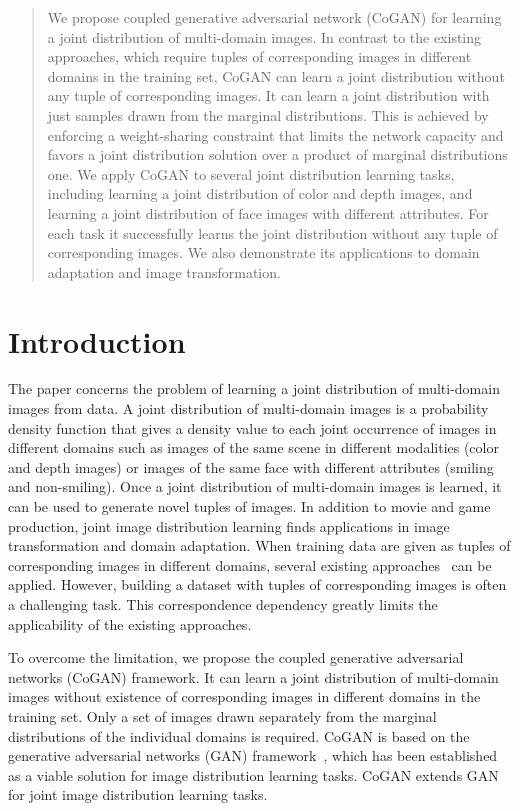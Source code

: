 \begin{abstract}
We propose coupled generative adversarial network (CoGAN) for learning a joint distribution of multi-domain images. In contrast to the existing approaches, which require tuples of corresponding images in different domains in the training set, CoGAN can learn a joint distribution without any tuple of corresponding images. It can learn a joint distribution with just samples drawn from the marginal distributions. This is achieved by enforcing a weight-sharing constraint that limits the network capacity and favors a joint distribution solution over a product of marginal distributions one. We apply CoGAN to several joint distribution learning tasks, including learning a joint distribution of color and depth images, and learning a joint distribution of face images with different attributes. For each task it successfully learns the joint distribution without any tuple of corresponding images. We also demonstrate its applications to domain adaptation and image transformation.
\end{abstract}

\section{Introduction}

The paper concerns the problem of learning a joint distribution of multi-domain images from data. A joint distribution of multi-domain images is a probability density function that gives a density value to each joint occurrence of images in different domains such as images of the same scene in different modalities (color and depth images) or images of the same face with different attributes (smiling and non-smiling). Once a joint distribution of multi-domain images is learned, it can be used to generate novel tuples of images. In addition to movie and game production, joint image distribution learning finds applications in image transformation and domain adaptation. When training data are given as tuples of corresponding images in different domains, several existing approaches~\cite{srivastava2012multimodal,wang2012semi,ngiam2011multimodal,yang2010image} can be applied. However, building a dataset with tuples of corresponding images is often a challenging task. This correspondence dependency greatly limits the applicability of the existing approaches.

To overcome the limitation, we propose the coupled generative adversarial networks (CoGAN) framework. It can learn a joint distribution of multi-domain images without existence of corresponding images in different domains in the training set. Only a set of images drawn separately from the marginal distributions of the individual domains is required. CoGAN is based on the generative adversarial networks (GAN) framework~\cite{goodfellow2014generative}, which has been established as a viable solution for image distribution learning tasks. CoGAN extends GAN for joint image distribution learning tasks.

